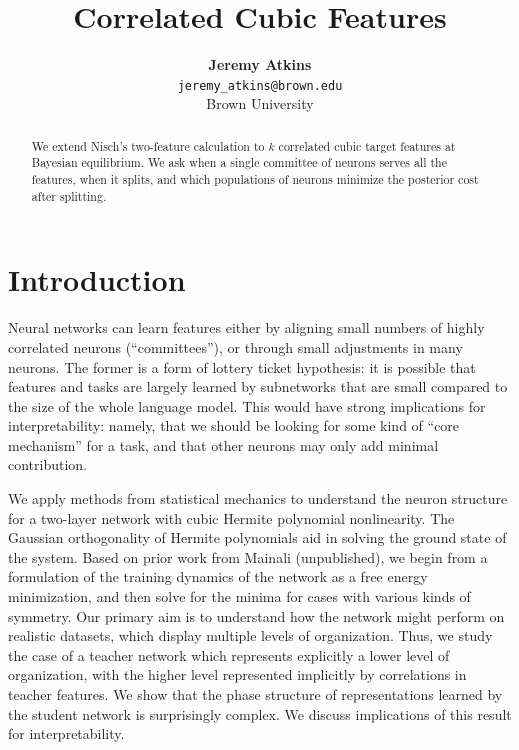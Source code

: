 \documentclass[midterm]{sparreport}
\title{Correlated Cubic Features}
\author{
  \textbf{Jeremy Atkins}\\
  \texttt{jeremy\_atkins@brown.edu}\\
  Brown University
}
\theoremstyle{definition}
\begin{document}
\maketitle

\begin{abstract}
We extend Nisch's two-feature calculation to $k$ correlated cubic target
features at Bayesian equilibrium. We ask when a single committee of neurons
serves all the features, when it splits, and which populations of neurons
minimize the posterior cost after splitting.
\end{abstract}


\section{Introduction}

Neural networks can learn features either by aligning small numbers of highly correlated neurons (``committees''), or through small adjustments in many neurons.
The former is a form of lottery ticket hypothesis: it is possible that features and tasks are largely learned by subnetworks that are small compared to the size of the whole language model.
This would have strong implications for interpretability: namely, that we should be looking for some kind of ``core mechanism'' for a task, and that other neurons may only add minimal contribution.

We apply methods from statistical mechanics to understand the neuron structure for a two-layer network with cubic Hermite polynomial nonlinearity.
The Gaussian orthogonality of Hermite polynomials aid in solving the ground state of the system.
Based on prior work from Mainali (unpublished), we begin from a formulation of the training dynamics of the network as a free energy minimization, and then solve for the minima for cases with various kinds of symmetry.
Our primary aim is to understand how the network might perform on realistic datasets, which display multiple levels of organization.
Thus, we study the case of a teacher network which represents explicitly a lower level of organization, with the higher level represented implicitly by correlations in teacher features.
We show that the phase structure of representations learned by the student network is surprisingly complex.
We discuss implications of this result for interpretability.
\end{document}
